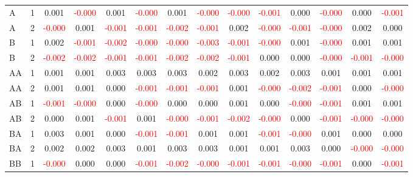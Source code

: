 \begin{table}[!htb]
{\begin{tabular}{llcccccccccccc}
A & 1 & 0.001 & \textcolor{red}{-0.000} & 0.001 & \textcolor{red}{-0.000} & 0.001 & \textcolor{red}{-0.000} & \textcolor{red}{-0.000} & \textcolor{red}{-0.001} & 0.000 & \textcolor{red}{-0.000} & 0.000 & \textcolor{red}{-0.001}\\
A & 2 & \textcolor{red}{-0.000} & 0.001 & \textcolor{red}{-0.001} & \textcolor{red}{-0.001} & \textcolor{red}{-0.002} & \textcolor{red}{-0.001} & 0.002 & \textcolor{red}{-0.000} & \textcolor{red}{-0.001} & \textcolor{red}{-0.000} & 0.002 & 0.000\\
B & 1 & 0.002 & \textcolor{red}{-0.001} & \textcolor{red}{-0.002} & \textcolor{red}{-0.000} & \textcolor{red}{-0.000} & \textcolor{red}{-0.003} & \textcolor{red}{-0.001} & \textcolor{red}{-0.000} & 0.001 & \textcolor{red}{-0.000} & 0.001 & 0.001\\
B & 2 & \textcolor{red}{-0.002} & \textcolor{red}{-0.002} & \textcolor{red}{-0.001} & \textcolor{red}{-0.001} & \textcolor{red}{-0.002} & \textcolor{red}{-0.002} & \textcolor{red}{-0.001} & 0.000 & 0.000 & \textcolor{red}{-0.000} & \textcolor{red}{-0.001} & \textcolor{red}{-0.000}\\
AA & 1 & 0.001 & 0.001 & 0.003 & 0.003 & 0.003 & 0.002 & 0.003 & 0.002 & 0.003 & 0.001 & 0.001 & 0.001\\
AA & 2 & 0.001 & 0.001 & 0.000 & \textcolor{red}{-0.001} & \textcolor{red}{-0.001} & \textcolor{red}{-0.001} & 0.001 & \textcolor{red}{-0.000} & \textcolor{red}{-0.002} & \textcolor{red}{-0.001} & 0.000 & \textcolor{red}{-0.000}\\
AB & 1 & \textcolor{red}{-0.001} & \textcolor{red}{-0.000} & 0.000 & \textcolor{red}{-0.000} & 0.000 & 0.000 & 0.001 & 0.000 & \textcolor{red}{-0.000} & \textcolor{red}{-0.001} & 0.001 & 0.001\\
AB & 2 & 0.000 & 0.001 & \textcolor{red}{-0.001} & 0.001 & \textcolor{red}{-0.000} & \textcolor{red}{-0.001} & \textcolor{red}{-0.002} & \textcolor{red}{-0.000} & 0.000 & \textcolor{red}{-0.001} & \textcolor{red}{-0.000} & \textcolor{red}{-0.000}\\
BA & 1 & 0.003 & 0.001 & 0.000 & \textcolor{red}{-0.001} & \textcolor{red}{-0.001} & 0.001 & 0.001 & \textcolor{red}{-0.001} & \textcolor{red}{-0.000} & 0.001 & 0.000 & 0.000\\
BA & 2 & 0.002 & 0.002 & 0.003 & 0.001 & 0.003 & 0.003 & 0.001 & 0.001 & 0.003 & 0.000 & \textcolor{red}{-0.000} & \textcolor{red}{-0.000}\\
BB & 1 & \textcolor{red}{-0.000} & 0.000 & 0.000 & \textcolor{red}{-0.001} & \textcolor{red}{-0.002} & \textcolor{red}{-0.000} & \textcolor{red}{-0.001} & \textcolor{red}{-0.001} & \textcolor{red}{-0.000} & \textcolor{red}{-0.001} & 0.000 & \textcolor{red}{-0.001}\\

\end{tabular}}
\end{table}

